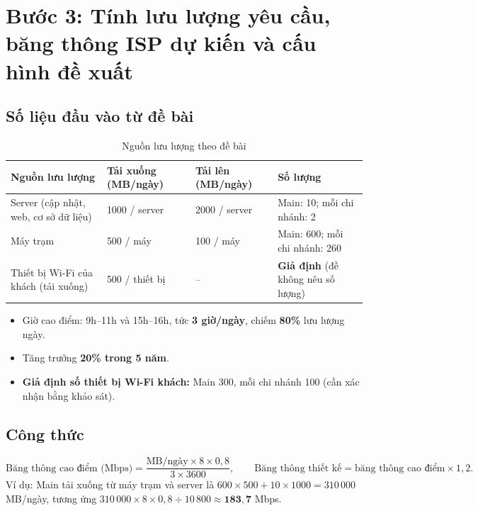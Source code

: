 \section{Bước 3: Tính lưu lượng yêu cầu, băng thông ISP dự kiến và cấu hình đề xuất}
\label{sec:step3}

\subsection{Số liệu đầu vào từ đề bài}
\begin{small}
\setlength{\tabcolsep}{4pt}
\begin{longtable}{|p{5.2cm}|p{2.6cm}|p{2.4cm}|p{3.6cm}|}
\caption{Nguồn lưu lượng theo đề bài} \label{tab:traffic_input} \\
\hline
\textbf{Nguồn lưu lượng} & \textbf{Tải xuống (MB/ngày)} & \textbf{Tải lên (MB/ngày)} & \textbf{Số lượng} \\ \hline
\endhead
Server (cập nhật, web, cơ sở dữ liệu) & 1000 / server & 2000 / server & Main: 10; mỗi chi nhánh: 2 \\ \hline
Máy trạm & 500 / máy & 100 / máy & Main: 600; mỗi chi nhánh: 260 \\ \hline
Thiết bị Wi-Fi của khách (tải xuống) & 500 / thiết bị & -- & \textbf{Giả định} (đề không nêu số lượng) \\ \hline
\end{longtable}
\end{small}
\begin{itemize}[noitemsep,topsep=2pt]
    \item Giờ cao điểm: 9h--11h và 15h--16h, tức \textbf{3 giờ/ngày}, chiếm \textbf{80\%} lưu lượng ngày.
    \item Tăng trưởng \textbf{20\% trong 5 năm}.
    \item \textbf{Giả định số thiết bị Wi-Fi khách:} Main 300, mỗi chi nhánh 100 (cần xác nhận bằng khảo sát).
\end{itemize}

\subsection{Công thức}
\[
\text{Băng thông cao điểm (Mbps)} = \frac{\text{MB/ngày} \times 8 \times 0{,}8}{3 \times 3600}, \qquad
\text{Băng thông thiết kế} = \text{băng thông cao điểm} \times 1{,}2 .
\]
Ví dụ: Main tải xuống từ máy trạm và server là $600\times500 + 10\times1000 = 310\,000$ MB/ngày, tương ứng $310\,000 \times 8 \times 0{,}8 \div 10\,800 \approx \mathbf{183{,}7}$ Mbps.

